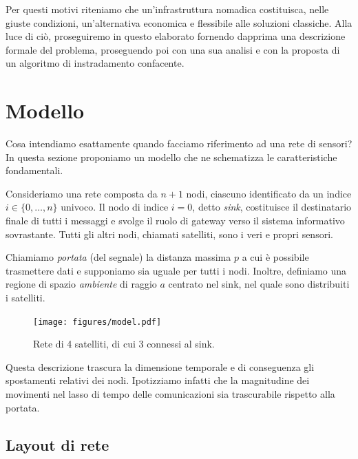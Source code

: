\documentclass[a4paper,12pt]{article}
\theoremstyle{definition}
\begin{document}
Per questi motivi riteniamo che un'infrastruttura nomadica costituisca, nelle giuste condizioni, un'alternativa economica e flessibile alle soluzioni classiche. Alla luce di ciò, proseguiremo in questo elaborato fornendo dapprima una descrizione formale del problema, proseguendo poi con una sua analisi e con la proposta di un algoritmo di instradamento confacente.

\section{Modello}

Cosa intendiamo esattamente quando facciamo riferimento ad una rete di sensori? In questa sezione proponiamo un modello che ne schematizza le caratteristiche fondamentali.



Consideriamo una rete composta da $n+1$ nodi, ciascuno identificato da un indice $i \in \{0, \dots, n\}$ univoco. Il nodo di indice $i=0$, detto \emph{sink}, costituisce il destinatario finale di tutti i messaggi e svolge il ruolo di gateway verso il sistema informativo sovrastante. Tutti gli altri nodi, chiamati satelliti, sono i veri e propri sensori.

Chiamiamo \emph{portata} (del segnale) la distanza massima $p$ a cui è possibile trasmettere dati e supponiamo sia uguale per tutti i nodi. Inoltre, definiamo una regione di spazio \emph{ambiente} di raggio $a$ centrato nel sink, nel quale sono distribuiti i satelliti.

\begin{figure}[H]
\centering
\texttt{[image: figures/model.pdf]}
\caption{Rete di 4 satelliti, di cui 3 connessi al sink.}
\end{figure}

Questa descrizione trascura la dimensione temporale e di conseguenza gli spostamenti relativi dei nodi. Ipotizziamo infatti che la magnitudine dei movimenti nel lasso di tempo delle comunicazioni sia trascurabile rispetto alla portata.

\subsection{Layout di rete}
\end{document}
